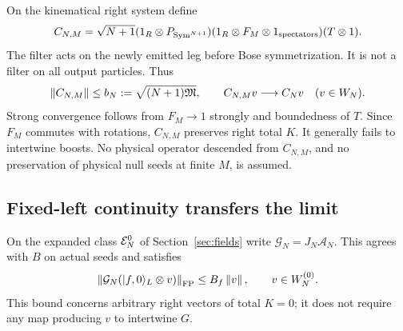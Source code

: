 On the kinematical right system define
\begin{equation}
 C_{N,M}=\sqrt{N+1}(1_R\otimes P_{\operatorname{Sym}^{N+1}})
 (1_R\otimes F_M\otimes1_{\rm spectators})(T\otimes1).
 \label{eq:filtered-creation}
\end{equation}
The filter acts on the newly emitted leg before Bose symmetrization.
It is not a filter on all output particles. Thus
\begin{equation}
 \left\lVert C_{N,M}\right\rVert\le b_N:=\sqrt{(N+1)\mathfrak M},\qquad
 C_{N,M}v\longrightarrow C_Nv\quad(v\in W_N).
 \label{eq:filtered-strong}
\end{equation}
Strong convergence follows from $F_M\to1$ strongly and boundedness of $T$.
Since $F_M$ commutes with rotations, $C_{N,M}$ preserves right total $K$.
It generally fails to intertwine boosts. No physical operator descended
from $C_{N,M}$, and no preservation of physical null seeds at finite $M$,
is assumed.

\subsection{Fixed-left continuity transfers the limit}
On the expanded class $\mathcal E_N^0$ of Section~\ref{sec:fields} write
$\mathcal G_N=J_N\mathcal A_N$. This agrees with $B$ on actual seeds and
satisfies
\begin{equation}
 \left\lVert\mathcal G_N(|f,0\rangle_L\otimes v)\right\rVert_{\mathrm{FP}}
 \le B_f\left\lVert v\right\rVert,\qquad v\in W_N^{(0)}.
 \label{eq:expanded-physical-map}
\end{equation}
This bound concerns arbitrary right vectors of total $K=0$; it does not
require any map producing $v$ to intertwine $G$.

